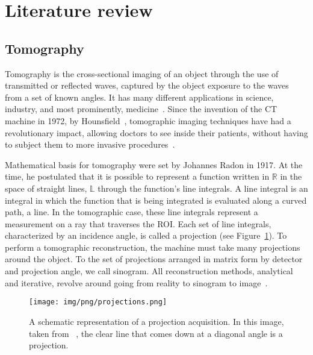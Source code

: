\section{Literature review}%
\label{sec:literature_review}

\subsection{Tomography}%
\label{sub:tomography}

Tomography is the cross-sectional imaging of an object through the use
of transmitted or reflected waves, captured by the object exposure to
the waves from a set of known angles. It has many different applications
in science, industry, and most prominently,
medicine~\cite{DeChiffre2014}. Since the invention of the \gls{CT}
machine in 1972, by Hounsfield~\cite{Gunderman2006}, tomographic imaging
techniques have had a revolutionary impact, allowing doctors to see
inside their patients, without having to subject them to more invasive
procedures~\cite{Kak2001}.

Mathematical basis for tomography were set by Johannes Radon in 1917. At
the time, he postulated that  it is possible to represent a function
written in $\mathbb{R}$ in the space of straight lines, $\mathbb{L}$
through the function's line integrals. A line integral is an integral in
which the function that is being integrated is evaluated along a curved
path, a line. In the tomographic case, these line integrals represent a
measurement on a ray that traverses the \gls{ROI}.  Each set of line
integrals, characterized by an incidence angle, is called a projection
(see Figure~\ref{fig:projection}). To perform a tomographic
reconstruction, the machine must take many projections around the
object. To the set of projections arranged in matrix form by detector
and projection angle, we call sinogram. All reconstruction methods,
analytical and iterative, revolve around going from reality to sinogram
to image~\cite{Bruyant2002, Kak2001, Herman1973, Herman1995, Herman2009,
Defrise2003}.

\begin{figure}[htpb]
    \centering
    \texttt{[image: img/png/projections.png]}
    \caption{A schematic representation of a projection acquisition. In
    this image, taken from ~\cite{Herman2009}, the clear line that comes
    down at a diagonal angle is a projection.}
    \label{fig:projection}
\end{figure}

